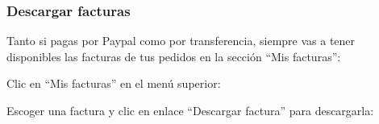 \documentclass[12pt, spanish]{article}
\begin{document}

    \subsubsection{Descargar facturas}

    \label{sec:download-invoices}

            Tanto si pagas por Paypal como por transferencia, siempre vas a tener disponibles
        las facturas de tus pedidos en la sección ``Mis facturas'':

    \begin{steps}

        \item Clic en ``Mis facturas'' en el menú superior:

            \medskip
            \begin{minipage}[t]{\linewidth}
            \raggedright
        \end{minipage}

        \item Escoger una factura y clic en enlace ``Descargar factura'' para descargarla:

            \medskip
            \begin{minipage}[t]{\linewidth}
            \raggedright
        \end{minipage}


\end{steps}
\end{document}
